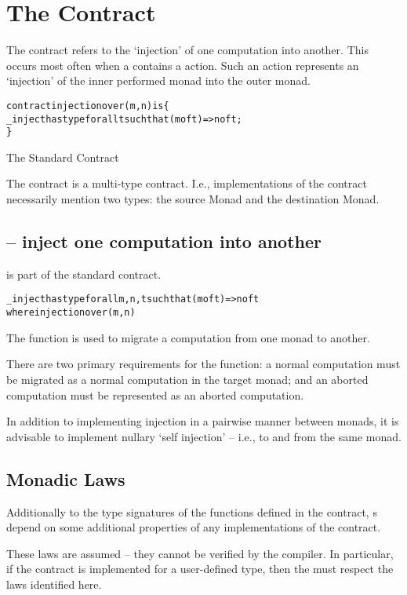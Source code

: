 \section{The  Contract}
\label{injection}

The  contract refers to the `injection' of one computation into another. This occurs most often when a  contains a  action. Such an action represents an `injection' of the inner performed monad into the outer monad.

\begin{program}
\begin{alltt}
contract injection over (m,n) is \{
  \_inject has type for all t such that (m of t)=>n of t;
\}
\end{alltt}
\caption{The Standard  Contract\label{injectionContractProg}}
\end{program}

The  contract is a multi-type contract. I.e., implementations of the  contract necessarily mention two types: the source Monad and the destination Monad. 

\subsection{ -- inject one computation into another}
\label{injectFunction}
 is part of the standard  contract.
\begin{alltt}
\_inject has type for all m,n,t such that (m of t)=>n of t
                  where injection over (m,n)
\end{alltt}
The  function is used to migrate a computation from one monad to another. 

There are two primary requirements for the  function: a normal computation must be migrated as a normal computation in the target monad; and an aborted computation must be represented as an aborted computation. 

In addition to implementing injection in a pairwise manner between monads, it is advisable to implement nullary `self injection' -- i.e., to and from the same monad.


\subsection{Monadic Laws}
\label{monadicAxioms}
Additionally to the type signatures of the functions defined in the  contract, s depend on some additional properties of any implementations of the contract.
\begin{aside}
These laws are assumed -- they cannot be verified by the compiler. In particular, if the  contract is implemented for a user-defined type, then the  must respect the laws identified here.
\end{aside}

